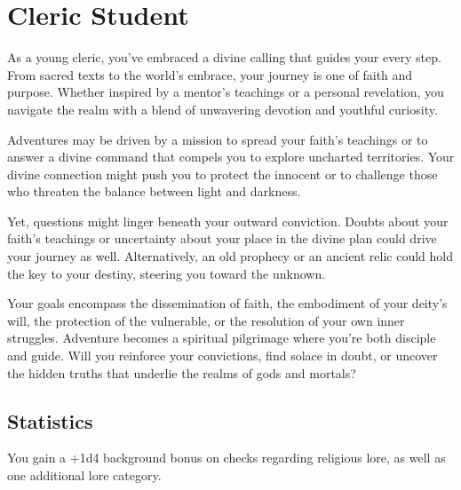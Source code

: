 \section{Cleric Student}\label{background:clericStudent}
As a young cleric, you've embraced a divine calling that guides your every step.
From sacred texts to the world's embrace, your journey is one of faith and purpose.
Whether inspired by a mentor's teachings or a personal revelation, you navigate the realm with a blend of unwavering devotion and youthful curiosity.

Adventures may be driven by a mission to spread your faith's teachings or to answer a divine command that compels you to explore uncharted territories.
Your divine connection might push you to protect the innocent or to challenge those who threaten the balance between light and darkness.

Yet, questions might linger beneath your outward conviction.
Doubts about your faith's teachings or uncertainty about your place in the divine plan could drive your journey as well.
Alternatively, an old prophecy or an ancient relic could hold the key to your destiny, steering you toward the unknown.

Your goals encompass the dissemination of faith, the embodiment of your deity's will, the protection of the vulnerable, or the resolution of your own inner struggles.
Adventure becomes a spiritual pilgrimage where you're both disciple and guide.
Will you reinforce your convictions, find solace in doubt, or uncover the hidden truths that underlie the realms of gods and mortals?

\subsection{Statistics}
You gain a +1d4 background bonus on checks regarding religious lore, as well as one additional lore category.
